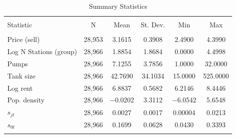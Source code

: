 
\begin{table}[!htbp] \centering 
  \caption{Summary Statistics} 
  \label{tab:summary} 
\begin{tabular}{@{\extracolsep{5pt}}lccccc} 
\\[-1.8ex]\hline 
\hline \\[-1.8ex] 
Statistic & \multicolumn{1}{c}{N} & \multicolumn{1}{c}{Mean} & \multicolumn{1}{c}{St. Dev.} & \multicolumn{1}{c}{Min} & \multicolumn{1}{c}{Max} \\ 
\hline \\[-1.8ex] 
Price (sell) & 28,953 & 3.1615 & 0.3908 & 2.4900 & 4.3990 \\ 
Log N Stations (group) & 28,966 & 1.8854 & 1.8684 & 0.0000 & 4.4998 \\ 
Pumps & 28,966 & 7.1255 & 3.7856 & 1.0000 & 32.0000 \\ 
Tank size & 28,966 & 42.7690 & 34.1034 & 15.0000 & 525.0000 \\ 
Log rent & 28,966 & 6.8837 & 0.5682 & 6.2146 & 8.4446 \\ 
Pop. density & 28,966 & $-$0.0202 & 3.3112 & $-$6.0542 & 5.6548 \\ 
$s_{jt}$ & 28,966 & 0.0027 & 0.0017 & 0.00004 & 0.0213 \\ 
$s_{0t}$ & 28,966 & 0.1699 & 0.0628 & 0.0430 & 0.3393 \\ 
\hline \\[-1.8ex] 
\end{tabular} 
\end{table} 
